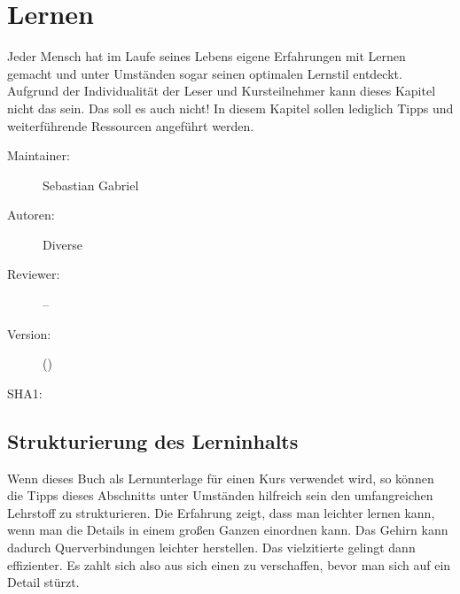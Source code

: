 \def\ChapterCode{LER}
\chapter
[\CO{[LER]} Lernen]
{Lernen} 

\ChapterIntro
{%
Jeder Mensch hat im Laufe seines Lebens eigene Erfahrungen
mit Lernen gemacht und unter Umständen sogar seinen
optimalen Lernstil entdeckt. Aufgrund der Individualität der
Leser und Kursteilnehmer kann dieses Kapitel nicht das
 sein. Das soll es
auch nicht! In diesem Kapitel sollen lediglich Tipps und
weiterführende Ressourcen angeführt werden.
}
{%
\begin{description}
  \item[Maintainer:] Sebastian Gabriel
  \item[Autoren:] Diverse
  \item[Reviewer:] --
  \item[Version:] {\DocVersion} ({\DocVersionInfo})
  \item[SHA1:] {\DocGitCommit}
\end{description}

{\TxTeilkapitelAASS}
}

\section{Strukturierung des Lerninhalts}
Wenn dieses Buch als Lernunterlage für einen Kurs verwendet
wird, so können die Tipps dieses Abschnitts unter Umständen
hilfreich sein den umfangreichen Lehrstoff zu strukturieren.
Die Erfahrung zeigt, dass man leichter lernen kann, wenn man
die Details in einem großen Ganzen einordnen kann. Das
Gehirn kann dadurch Querverbindungen leichter herstellen.
Das vielzitierte 
gelingt dann effizienter. Es zahlt sich also aus sich einen
 zu verschaffen, bevor man sich auf ein Detail
stürzt.

